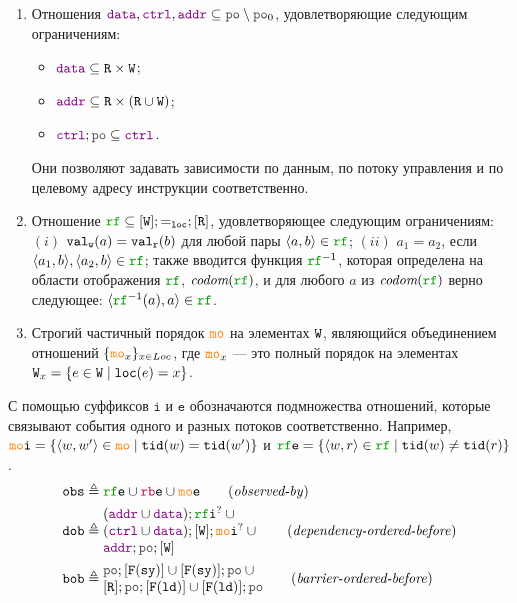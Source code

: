 \begin{definition}
\begin{enumerate}
\item Отношения $\lDATA,\lCTRL,\lADDR\suq \lPO\setminus \lPO_0$, удовлетворяющие следующим ограничениям:
\begin{itemize}
\item $\lDATA \suq \lR \times \lW$;
\item $\lADDR\suq \lR \times (\lR \cup \lW)$;
\item $\lCTRL;\lPO \suq \lCTRL$. 
\end{itemize}
Они позволяют задавать зависимости по данным, по потоку управления и по целевому адресу инструкции соответственно.
\item Отношение $\lRF \suq [\lW]; {=_\lLOC}; [\lR]$, удовлетворяющее следующим ограничениям:
$(i)$ ${\mathtt{val_w}}(a)={\mathtt{val_r}}(b)$ для любой пары $\tup{a,b}\in \lRF$;
$(ii)$ $a_1=a_2$, если $\tup{a_1,b},\tup{a_2,b}\in \lRF$; также вводится функция $\lRF^{-1}$, которая определена на
области отображения $\lRF$, $\codom{\lRF}$, и для любого $a$ из $\codom{\lRF}$ верно следующее: $\tup{\lRF^{-1}(a), a} \in \lRF$.
\item Строгий частичный порядок $\lCO$ на элементах ${\mathtt{W}}$,
      являющийся объединением отношений $\{\lCOx\}_{x\in\Loc}$,
      где $\lCOx$ --- это полный порядок на элементах ${\mathtt{W}}_x = \{ e \in {\mathtt{W}} \; | \; {\mathtt{loc}}(e) = x\}$.
\end{enumerate}
\end{definition}
\noindent
С помощью суффиксов $\mathtt{i}$ и $\mathtt{e}$ обозначаются подмножества отношений, которые связывают события одного
и разных потоков соответственно. 
Например, $\lCOI = \{ \tup{w, w'} \in \lCO \mid \lTID(w) = \lTID(w') \}$ и
$\lRFE = \{ \tup{w, r} \in \lRF \mid \lTID(w) \neq \lTID(r) \}$.
\begin{align*}
\lOBS &\defeq  \lRFE \cup \lFRE \cup \lCOE  \tag{\emph{observed-by}} \\
\lDOB &\defeq \inarr{(\lADDR \cup \lDATA); \lRFI^? \cup {} \\
	(\lCTRL \cup \lDATA); [\lW]; \lCOI^? \cup {} \\
	\lADDR; \lPO; [\lW]} \tag{\emph{dependency-ordered-before}} \\
\lBOB &\defeq \inarr{\lPO; [\lDMBSY] \cup [\lDMBSY]; \lPO  \cup {} \\
                    {} [\lR]; \lPO; [\lDMBLD] \cup [\lDMBLD]; \lPO} \tag{\emph{barrier-ordered-before}}
\end{align*}
